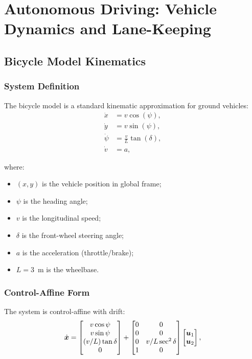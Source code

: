 \section{Autonomous Driving: Vehicle Dynamics and Lane-Keeping}

\subsection{Bicycle Model Kinematics}

\subsubsection{System Definition}

The bicycle model is a standard kinematic approximation for ground vehicles:
\begin{align}
\dot{x} &= v \cos(\psi), \label{eq:ch8:bicycle-x} \\
\dot{y} &= v \sin(\psi), \label{eq:ch8:bicycle-y} \\
\dot{\psi} &= \frac{v}{L} \tan(\delta), \label{eq:ch8:bicycle-psi} \\
\dot{v} &= a, \label{eq:ch8:bicycle-v}
\end{align}

where:
\begin{itemize}
\item $(x, y)$ is the vehicle position in global frame;
\item $\psi$ is the heading angle;
\item $v$ is the longitudinal speed;
\item $\delta$ is the front-wheel steering angle;
\item $a$ is the acceleration (throttle/brake);
\item $L = 3$~m is the wheelbase.
\end{itemize}

\subsubsection{Control-Affine Form}

The system is control-affine with drift:
\begin{equation}
\dot{\bm{x}} = \begin{bmatrix}
v\cos\psi \\ v\sin\psi \\ (v/L)\tan\delta \\ 0
\end{bmatrix} + \begin{bmatrix}
0 & 0 \\ 0 & 0 \\ 0 & v/L \sec^2\delta \\ 1 & 0
\end{bmatrix}\begin{bmatrix}
\bm{u}_1 \\ \bm{u}_2
\end{bmatrix},
\label{eq:ch8:bicycle-affine}
\end{equation}

